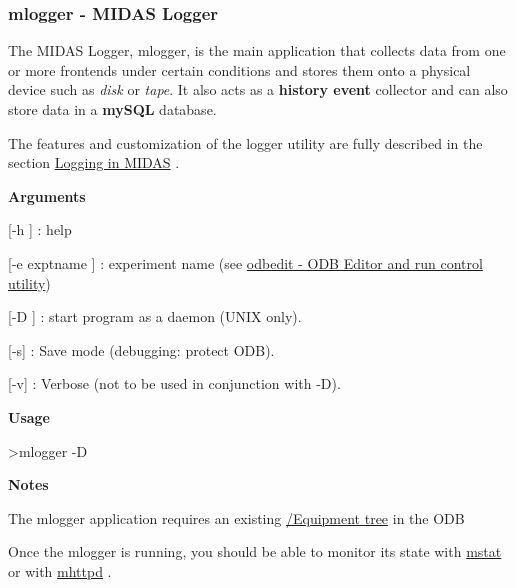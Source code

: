 \par
 \label{F_Logging_idx_Logging_utility-see-mlogger}
\hypertarget{F_Logging_idx_Logging_utility-see-mlogger}{}
 \label{F_Logging_idx_mlogger-utility}
\hypertarget{F_Logging_idx_mlogger-utility}{}
\hypertarget{F_Logging_F_mlogger_utility}{}\subsubsection{mlogger     -\/ MIDAS Logger}\label{F_Logging_F_mlogger_utility}
The MIDAS Logger, mlogger, is the main application that collects data from one or more frontends under certain conditions and stores them onto a physical device such as {\itshape disk\/} or {\itshape tape\/}. It also acts as a {\bfseries  history event } collector and can also store data in a {\bfseries mySQL} database. \par
 The features and customization of the logger utility are fully described in the section \hyperlink{F_Logging}{Logging in MIDAS} .


\begin{DoxyItemize}
\item {\bfseries  Arguments }
\begin{DoxyItemize}
\item \mbox{[}-\/h \mbox{]} : help
\item \mbox{[}-\/e exptname \mbox{]} : experiment name (see \hyperlink{RC_odbedit_utility}{odbedit -\/ ODB Editor and run control utility})
\item \mbox{[}-\/D \mbox{]} : start program as a daemon (UNIX only).
\item \mbox{[}-\/s\mbox{]} : Save mode (debugging: protect ODB).
\item \mbox{[}-\/v\mbox{]} : Verbose (not to be used in conjunction with -\/D).
\end{DoxyItemize}
\end{DoxyItemize}


\begin{DoxyItemize}
\item {\bfseries  Usage } 
\begin{DoxyCode}
 >mlogger -D 
\end{DoxyCode}

\end{DoxyItemize}

{\bfseries  Notes } 
\begin{DoxyItemize}
\item The mlogger application requires an existing \hyperlink{FE_ODB_equipment_tree}{/Equipment tree} in the ODB 
\item Once the mlogger is running, you should be able to monitor its state with \hyperlink{RC_Monitor_RC_mstat_utility}{mstat} or with \hyperlink{RC_mhttpd_utility}{mhttpd} . 
\end{DoxyItemize}\par


